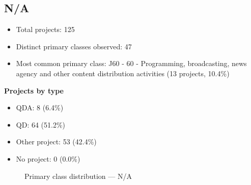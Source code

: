 \subsection{N/A}

\begin{itemize}
    \item Total projects: 125
    \item Distinct primary classes observed: 47
    \item Most common primary class: J60 - 60 - Programming, broadcasting, news agency and other content distribution activities (13 projects, 10.4\%)
\end{itemize}
\textbf{Projects by type}
\begin{itemize}
    \item QDA: 8 (6.4\%)
    \item QD: 64 (51.2\%)
    \item Other project: 53 (42.4\%)
    \item No project: 0 (0.0\%)
\end{itemize}

\begin{figure}[h]
    \centering
    
    \caption{Primary class distribution --- N/A}
\end{figure}

